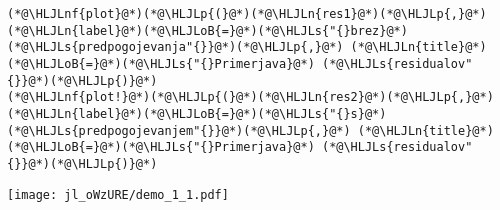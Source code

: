 \documentclass[12pt,a4paper]{article}
\newcommand{\HLJLn}[1]{#1}
\newcommand{\HLJLnf}[1]{\textcolor[RGB]{66,102,213}{#1}}
\newcommand{\HLJLs}[1]{\textcolor[RGB]{201,61,57}{#1}}
\newcommand{\HLJLoB}[1]{\textcolor[RGB]{102,102,102}{\textbf{#1}}}
\newcommand{\HLJLp}[1]{#1}
\begin{document}
\begin{lstlisting}
(*@\HLJLnf{plot}@*)(*@\HLJLp{(}@*)(*@\HLJLn{res1}@*)(*@\HLJLp{,}@*) (*@\HLJLn{label}@*)(*@\HLJLoB{=}@*)(*@\HLJLs{"{}brez}@*) (*@\HLJLs{predpogojevanja"{}}@*)(*@\HLJLp{,}@*) (*@\HLJLn{title}@*)(*@\HLJLoB{=}@*)(*@\HLJLs{"{}Primerjava}@*) (*@\HLJLs{residualov"{}}@*)(*@\HLJLp{)}@*)
(*@\HLJLnf{plot!}@*)(*@\HLJLp{(}@*)(*@\HLJLn{res2}@*)(*@\HLJLp{,}@*) (*@\HLJLn{label}@*)(*@\HLJLoB{=}@*)(*@\HLJLs{"{}s}@*) (*@\HLJLs{predpogojevanjem"{}}@*)(*@\HLJLp{,}@*) (*@\HLJLn{title}@*)(*@\HLJLoB{=}@*)(*@\HLJLs{"{}Primerjava}@*) (*@\HLJLs{residualov"{}}@*)(*@\HLJLp{)}@*)
\end{lstlisting}

\texttt{[image: jl\_oWzURE/demo\_1\_1.pdf]}
\end{document}
